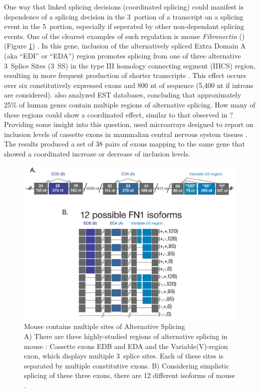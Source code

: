     One way that linked splicing decisions (coordinated splicing) could manifest is dependence of a splicing decision in the 3\textprime~portion of a transcript on a splicing event in the 5\textprime~portion, especially if seperated by other non-dependant splicing events. One of the clearest examples of such regulation is mouse \textit{Fibronectin} (\fn{}) (Figure \ref{Intro:fig:mouseFn1}) \citep{Schwarzbauer1983, White2011a}. In this gene, inclusion of the alternatively spliced Extra Domain A (aka ``EDI'' or ``EDA'') region promotes splicing from one of three alternative 3\textprime~Splice Sites (3\textprime~SS) in the type III homology connecting segment (IIICS) region, resulting in more frequent production of shorter transcripts \citep{Fededa2005}. This effect occurs over six constitutively expressed exons and 800 nt of sequence (5,400 nt if introns are considered). \citet{Fededa2005} also analyzed EST databases, concluding that approximately 25\% of human genes contain multiple regions of alternative splicing. How many of these regions could show a coordinated effect, similar to that observed in \fn{}? Providing some insight into this question, \citep{Fagnani2007} used microarrays designed to report on inclusion levels of cassette exons in mammalian central nervous system tissues \citep{Fagnani2007}. The results produced a set of 38 pairs of exons mapping to the same gene that showed a coordinated increase or decrease of inclusion levels. 

    \begin{figure} %
      \centering 
      \includegraphics{Figures/Intro/Fibronectin.eps}
      \caption[Mouse \fn{} contains multiple sites of Alternative Splicing]
      {
        Mouse \fn{} contains multiple sites of Alternative Splicing\\[0.25cm]
        A) There are three highly-studied regions of alternative splicing in mouse \fn{}: Cassette exons EDB and EDA and the Variable(V)-region exon, which displays multiple 3\textprime~splice sites.  Each of these sites is separated by multiple constitutive exons. B) Considering simplistic splicing of these three exons, there are 12 different isoforms of mouse \fn{}.
        }
      \label{Intro:fig:mouseFn1}
      \end{figure}

